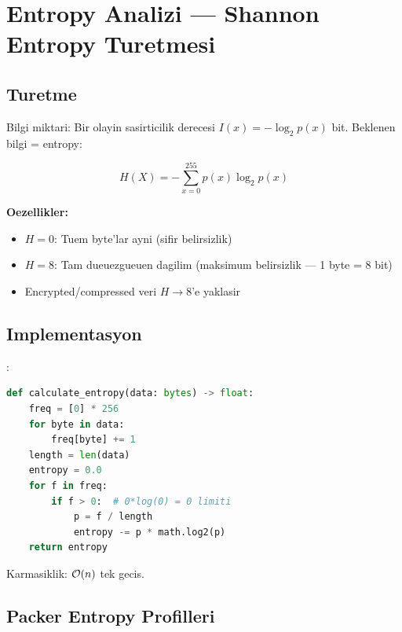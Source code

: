 

\section{Entropy Analizi --- Shannon Entropy Turetmesi}
\label{sec:entropy-deep}

\subsection{Turetme}

Bilgi miktari: Bir olayin sasirticilik derecesi $I(x) = -\log_2 p(x)$ bit. Beklenen bilgi = entropy:

\begin{equation}
\boxed{H(X) = -\sum_{x=0}^{255} p(x) \log_2 p(x)}
\label{eq:shannon-entropy}
\end{equation}

\textbf{Oezellikler:}
\begin{itemize}
\item $H = 0$: Tuem byte'lar ayni (sifir belirsizlik)
\item $H = 8$: Tam dueuezgueuen dagilim (maksimum belirsizlik --- 1 byte = 8 bit)
\item Encrypted/compressed veri $H \to 8$'e yaklasir
\end{itemize}

\subsection{Implementasyon}

:

\begin{lstlisting}[language=Python]
def calculate_entropy(data: bytes) -> float:
    freq = [0] * 256
    for byte in data:
        freq[byte] += 1
    length = len(data)
    entropy = 0.0
    for f in freq:
        if f > 0:  # 0*log(0) = 0 limiti
            p = f / length
            entropy -= p * math.log2(p)
    return entropy
\end{lstlisting}

Karmasiklik: $\mathcal{O}\!\left(n\right)$ tek gecis.

\subsection{Packer Entropy Profilleri}

